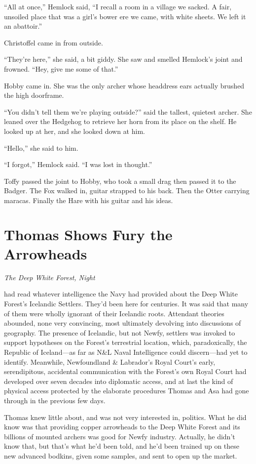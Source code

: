 \documentclass[11pt,a5paper]{article}
\newcommand{\alet}[1]{\textit{#1}\vspace{1em}}
\begin{document}
``All at once,'' Hemlock said, ``I recall a room in a village we sacked. A fair, unsoiled place that was a girl's bower ere we came, with white sheets. We left it an abattoir.''

Christoffel came in from outside.

``They're here,'' she said, a bit giddy. She saw and smelled Hemlock's joint and frowned. ``Hey, give me some of that.''

Hobby came in. She was the only archer whose headdress ears actually brushed the high doorframe.

``You didn't tell them we're playing outside?'' said the tallest, quietest archer. She leaned over the Hedgehog to retrieve her horn from its place on the shelf. He looked up at her, and she looked down at him.

``Hello,'' she said to him.

``I forgot,'' Hemlock said. ``I was lost in thought.''

Toffy passed the joint to Hobby, who took a small drag then passed it to the Badger. The Fox walked in, guitar strapped to his back. Then the Otter carrying maracas. Finally the Hare with his guitar and his ideas.

\newpage

\section{Thomas Shows Fury the Arrowheads}

\alet{The Deep White Forest, Night}

 had read whatever intelligence the Navy had provided about the Deep White Forest's Icelandic Settlers. They'd been here for centuries. It was said that many of them were wholly ignorant of their Icelandic roots. Attendant theories abounded, none very convincing, most ultimately devolving into discussions of geography. The presence of Icelandic, but not Newfy, settlers was invoked to support hypotheses on the Forest's terrestrial location, which, paradoxically, the Republic of Iceland---as far as N\&L Naval Intelligence could discern---had yet to identify. Meanwhile, Newfoundland \& Labrador's Royal Court's early, serendipitous, accidental communication with the Forest's own Royal Court had developed over seven decades into diplomatic access, and at last the kind of physical access protected by the elaborate procedures Thomas and Asa had gone through in the previous few days.

Thomas knew little about, and was not very interested in, politics. What he did know was that providing copper arrowheads to the Deep White Forest and its billions of mounted archers was good for Newfy industry. Actually, he didn't know that, but that's what he'd been told, and he'd been trained up on these new advanced bodkins, given some samples, and sent to open up the market.
\end{document}
